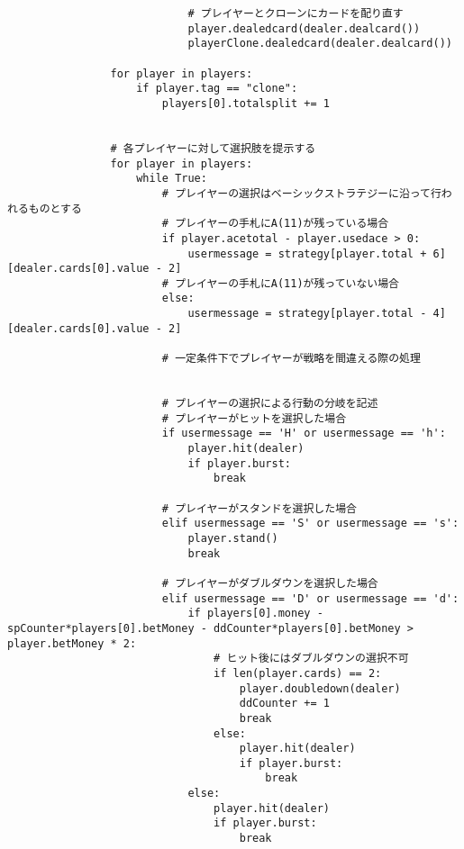 \begin{itemize}
\begin{lstlisting}
                            # プレイヤーとクローンにカードを配り直す
                            player.dealedcard(dealer.dealcard())
                            playerClone.dealedcard(dealer.dealcard())

                for player in players:
                    if player.tag == "clone":
                        players[0].totalsplit += 1


                # 各プレイヤーに対して選択肢を提示する
                for player in players:
                    while True:
                        # プレイヤーの選択はベーシックストラテジーに沿って行われるものとする
                        # プレイヤーの手札にA(11)が残っている場合
                        if player.acetotal - player.usedace > 0:
                            usermessage = strategy[player.total + 6][dealer.cards[0].value - 2]
                        # プレイヤーの手札にA(11)が残っていない場合
                        else:
                            usermessage = strategy[player.total - 4][dealer.cards[0].value - 2]

                        # 一定条件下でプレイヤーが戦略を間違える際の処理


                        # プレイヤーの選択による行動の分岐を記述
                        # プレイヤーがヒットを選択した場合
                        if usermessage == 'H' or usermessage == 'h':
                            player.hit(dealer)
                            if player.burst:
                                break

                        # プレイヤーがスタンドを選択した場合
                        elif usermessage == 'S' or usermessage == 's':
                            player.stand()
                            break

                        # プレイヤーがダブルダウンを選択した場合
                        elif usermessage == 'D' or usermessage == 'd':
                            if players[0].money -spCounter*players[0].betMoney - ddCounter*players[0].betMoney > player.betMoney * 2:
                                # ヒット後にはダブルダウンの選択不可
                                if len(player.cards) == 2:
                                    player.doubledown(dealer)
                                    ddCounter += 1
                                    break
                                else:
                                    player.hit(dealer)
                                    if player.burst:
                                        break
                            else:
                                player.hit(dealer)
                                if player.burst:
                                    break


\end{lstlisting}
\end{itemize}
